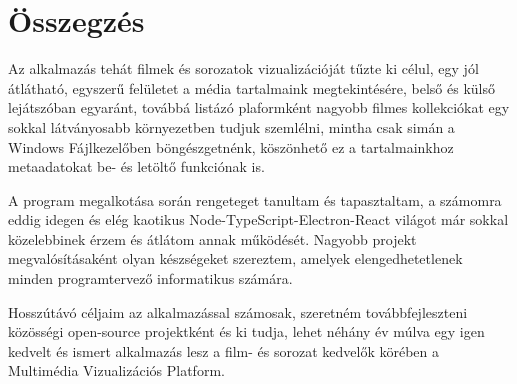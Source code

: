 \chapter{Összegzés} %
\label{ch:sum}

Az alkalmazás tehát filmek és sorozatok vizualizációját tűzte ki célul, egy jól átlátható, egyszerű felületet a média tartalmaink megtekintésére, belső és külső lejátszóban egyaránt, továbbá listázó plaformként nagyobb filmes kollekciókat egy sokkal látványosabb környezetben tudjuk szemlélni, mintha csak simán a Windows Fájlkezelőben böngészgetnénk, köszönhető ez a tartalmainkhoz metaadatokat be- és letöltő funkciónak is.

A program megalkotása során rengeteget tanultam és tapasztaltam, a számomra eddig idegen és elég kaotikus Node-TypeScript-Electron-React világot már sokkal közelebbinek érzem és átlátom annak működését. Nagyobb projekt megvalósításaként olyan készségeket szereztem, amelyek elengedhetetlenek minden programtervező informatikus számára.

Hosszútávó céljaim az alkalmazással számosak, szeretném továbbfejleszteni közösségi open-source projektként és ki tudja, lehet néhány év múlva egy igen kedvelt és ismert alkalmazás lesz a film- és sorozat kedvelők körében a Multimédia Vizualizációs Platform.
